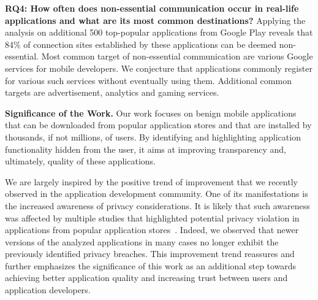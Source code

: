 \vspace{0.1in}
\noindent 
{\bf RQ4: How often does non-essential communication occur in real-life applications and what are its most common destinations?}
Applying the analysis on additional 500 top-popular applications from Google Play reveals that 84\% of connection sites established by these applications can be deemed non-essential.
Most common target of non-essential communication are various Google services for mobile developers. We conjecture 
that applications commonly register for various such services without eventually using them. 
Additional common targets are advertisement, analytics and gaming services. 

\vspace{0.1in}
\noindent 
{\bf Significance of the Work.}
Our work focuses on benign  mobile applications that can be downloaded from popular application stores and that are installed by thousands, if not millions, of users.
By identifying and highlighting application functionality hidden from the user, it aims at improving transparency and, ultimately, quality of these applications. 
 
We are largely inspired by the positive trend of improvement that we recently observed in the application development community.
One of its manifestations is the increased awareness of privacy considerations. It is likely that such awareness was affected by multiple studies that highlighted
potential privacy violation in applications from popular application stores~\cite{Enck:Gilbert:Chun:Cox:Jung:McDaniel:Sheth:OSDI10, Egele:Kruegel:Kirda:Vign:NDSS11,Tripp:Rubin:SEC14}.
Indeed, we observed that newer versions of the analyzed applications in many cases no longer exhibit the previously identified privacy breaches.  
This improvement trend reassures and further emphasizes the significance of this work as an additional step towards achieving better application quality and increasing trust between users and application developers. 





